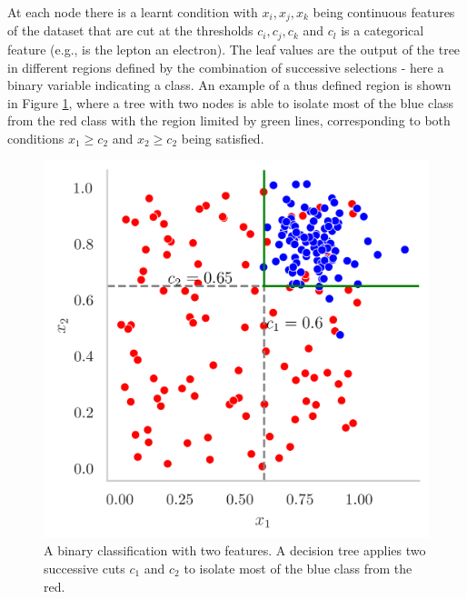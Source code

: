 At each node there is a learnt condition with $x_i, x_j, x_k$ being continuous features of the dataset that are cut at the thresholds $c_i, c_j, c_k$ and $c_l$ is a categorical feature (e.g., is the lepton an electron). The leaf values are the output of the tree in different regions defined by the combination of successive selections - here a binary variable indicating a class. An example of a thus defined region is shown in Figure \ref{fig:tree-ex}, where a tree with two nodes is able to isolate most of the blue class from the red class with the region limited by green lines, corresponding to both conditions $x_1 \geq c_2$ and $x_2 \geq c_2$ being satisfied.

\begin{figure}[h!]
    \center
    \begin{minipage}[c]{0.3\textwidth}
        \caption{A binary classification with two features. A decision tree applies two successive cuts $c_1$ and $c_2$ to isolate most of the blue class from the red.}\label{fig:tree-ex}
      \end{minipage}
      \begin{minipage}[c]{0.5\textwidth}
        \includegraphics[width=\textwidth]{Images/ML/scatterPlot.png}
      \end{minipage}
\end{figure}
    
